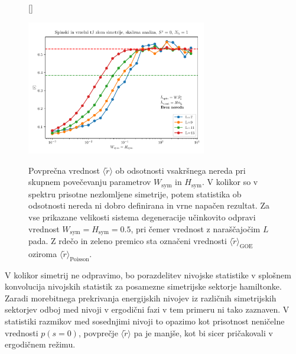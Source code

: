 \begin{figure}[H]
[\FBwidth]
{\caption{ Povprečna vrednost $\langle\tilde{r}\rangle$ ob odsotnosti vsakršnega nereda pri skupnem povečevanju parametrov $W_\mathrm{sym}$ in $H_\mathrm{sym}$. V kolikor so v spektru prisotne nezlomljene simetrije, potem statistika ob odsotnosti nereda ni dobro definirana in vrne napačen rezultat. Za vse prikazane velikosti sistema degeneracije učinkovito odpravi vrednost $W_\mathrm{sym}=H_\mathrm{sym}=0.5$, pri čemer vrednost z naraščajočim $L$ pada. Z rdečo in zeleno premico sta označeni vrednosti $\langle \tilde{r}\rangle_\mathrm{GOE}$ oziroma $\langle \tilde{r}\rangle_\mathrm{Poisson}$. }\label{fig:hole_spin_disorder_sym_break_13_1_6_slo}}
{\includegraphics[width=0.7\textwidth]{hole_spin_disorder_sym_break_13_1_6_slo.pdf}}
\end{figure}
\noindent
V kolikor simetrij ne odpravimo, bo porazdelitev nivojske statistike v splošnem konvolucija nivojskih statistik za posamezne simetrijske sektorje hamiltonke. Zaradi morebitnega prekrivanja energijskih nivojev iz različnih simetrijskih sektorjev odboj med nivoji v ergodični fazi v tem primeru ni tako zaznaven. V statistiki razmikov med sosednjimi nivoji to opazimo kot prisotnost neničelne vrednosti $p(s=0)$, povprečje $\langle \tilde{r}\rangle$ pa je manjše, kot bi sicer pričakovali v ergodičnem režimu. 
